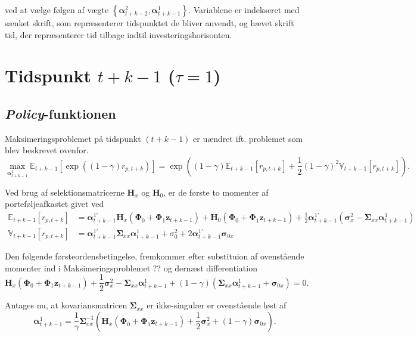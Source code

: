 \documentclass[
  a4paper,
  oneside]{memoir}
\begin{document}
ved at vælge følgen af vægte \(\left\{\bm{\alpha}_{t+k-2}^2, \bm{\alpha}_{t+k-1}^1\right\}\). Variablene er indekseret med sænket skrift, som repræsenterer tidspunktet de bliver anvendt, og hævet skrift tid, der repræsenterer tid tilbage indtil investeringshorisonten.

\hypertarget{tidspunkt-tk-1-tau1}{%
\section{\texorpdfstring{Tidspunkt \(t+k-1\) (\(\tau=1\))}{Tidspunkt t+k-1 (\textbackslash tau=1)}}\label{tidspunkt-tk-1-tau1}}

\hypertarget{policy-funktionen}{%
\subsection{\texorpdfstring{\emph{Policy}-funktionen}{Policy-funktionen}}\label{policy-funktionen}}

Maksimeringsproblemet på tidspunkt \((t+k-1)\) er uændret ift. problemet som blev beskrevet ovenfor.
\[\max_{\bm{\alpha}_{t+k-1}^1} \mathbb{E}_{t+k-1}[\exp((1-\gamma)r_{p,t+k})] = \exp\left((1-\gamma) \mathbb{E}_{t+k-1}[r_{p,t+k}]+\frac{1}{2}(1-\gamma)^2 \mathbb{V}_{t+k-1}[r_{p,t+k}]\right).\]

Ved brug af selektionsmatricerne \(\bm{H}_x\) og \(\bm{H}_0\), er de første to momenter af porteføljeafkastet givet ved
\begin{align*}
\mathbb{E}_{t+k-1}[r_{p,t+k}]&= \bm{\alpha}_{t+k-1}^{1\prime} \bm{H}_x (\bm{\Phi}_0 +\bm{\Phi}_1\bm{z}_{t+k-1}) + \bm{H}_0(\bm{\Phi}_0 +\bm{\Phi}_1\bm{z}_{t+k-1})+\frac{1}{2} \bm{\alpha}_{t+k-1}^{1\prime} (\bm{\sigma}_x^2-\bm{\Sigma}_{xx}\bm{\alpha}_{t+k-1}^{1})\\
\mathbb{V}_{t+k-1}[r_{p,t+k}]&=\bm{\alpha}_{t+k-1}^{1\prime}\bm{\Sigma}_{xx}\bm{\alpha}_{t+k-1}^{1}+ \sigma_0^2 + 2\bm{\alpha}_{t+k-1}^{1\prime}\bm{\sigma}_{0x}
\end{align*}

Den følgende førsteordensbetingelse, fremkommer efter substituion af ovenstående momenter ind i Maksimeringsproblemet ?? og dernæst differentiation
\[\bm{H}_x(\bm{\Phi}_0 +\bm{\Phi}_1\bm{z}_{t+k-1})+\frac{1}{2}\bm{\sigma}_x^2 - \bm{\Sigma}_{xx} \bm{\alpha}_{t+k-1}^{1}+(1-\gamma) (\bm{\Sigma}_{xx}\bm{\alpha}_{t+k-1}^{1}+\bm{\sigma}_{0x})=0.\]

Antages nu, at kovariansmatricen \(\bm{\Sigma}_{xx}\) er ikke-singulær er ovenstående løst af
\[\bm{\alpha}_{t+k-1}^{1}=\frac{1}{\gamma}\bm{\Sigma}_{xx}^{-1}\left(\bm{H}_x(\bm{\Phi}_0 +\bm{\Phi}_1\bm{z}_{t+k-1})+\frac{1}{2}\bm{\sigma}_x^2+(1-\gamma) \bm{\sigma}_{0x}\right).\]
\end{document}
